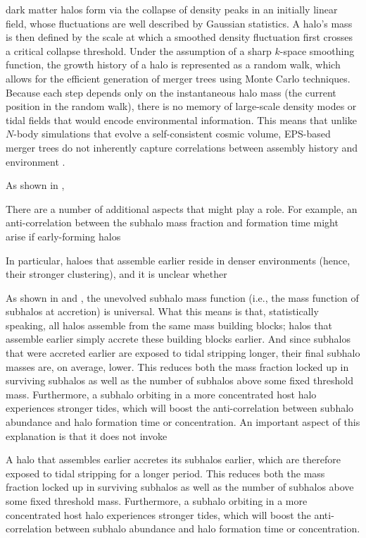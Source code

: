 \citet{Xie.Gao.15}

dark matter halos form via the collapse of density peaks in an initially linear field, whose fluctuations are well described by Gaussian statistics. A halo’s mass is then defined by the scale at which a smoothed density fluctuation first crosses a critical collapse threshold. Under the assumption of a sharp $k$-space smoothing function, the growth history of a halo is represented as a random walk, which allows for the efficient generation of merger trees using Monte Carlo techniques. Because each step depends only on the instantaneous halo mass (the current position in the random walk), there is no memory of large-scale density modes or tidal fields that would encode environmental information. This means that unlike $N$-body simulations that evolve a self-consistent cosmic volume, EPS-based merger trees do not inherently capture correlations between assembly history and environment \citep{Gao.etal.05, Zentner.07, Ma.etal.11, Zhang.etal.14}.

As shown in \citet{Jiang.vdBosch.16},


There are a number of additional aspects that might play a role. For example, an anti-correlation between the subhalo mass fraction and formation time might arise if early-forming halos 


In particular, haloes that assemble earlier reside in denser environments (hence, their stronger clustering), and it is unclear whether 

As shown in \citet{Giocoli.etal.08} and \citet{Jiang.vdBosch.16}, the unevolved subhalo mass function (i.e., the mass function of subhalos at accretion) is universal. What this means is that, statistically speaking, all halos assemble from the same mass building blocks; halos that assemble earlier simply accrete these building blocks earlier. And since subhalos that were accreted earlier are exposed to tidal stripping longer, their final subhalo masses are, on average, lower. This reduces both the mass fraction locked up in surviving subhalos as well as the number of subhalos above some fixed threshold mass. Furthermore, a subhalo orbiting in a more concentrated host halo experiences stronger tides, which will boost the anti-correlation between subhalo abundance and halo formation time or concentration. An important aspect of this explanation is that it does not invoke 




A halo that assembles earlier accretes its subhalos earlier, which are therefore exposed to tidal stripping for a longer period. This reduces both the mass fraction locked up in surviving subhalos as well as the number of subhalos above some fixed threshold mass. Furthermore, a subhalo orbiting in a more concentrated host halo experiences stronger tides, which will boost the anti-correlation between
subhalo abundance and halo formation time or concentration.




